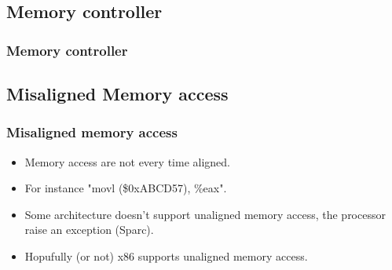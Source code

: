 \begin{frame}
\begin{center}
\begin{overlayarea}{10cm}{10cm}
    \end{overlayarea}
  \end{center}
\end{frame}


\subsection{Memory controller}
\begin{frame}
  \frametitle{Memory controller}
  \begin{center}
  \end{center}
\end{frame}


\subsection{Misaligned Memory access}
\begin{frame}
\frametitle{Misaligned memory access}
  \begin{itemize}
    \item Memory access are not every time aligned.
    \item For instance "movl (\$0xABCD57), \%eax".
    \item Some architecture doesn't support unaligned memory access, the
    processor raise an exception (Sparc).
    \item Hopufully (or not) x86 supports unaligned memory access.
  \end{itemize}
\end{frame}

